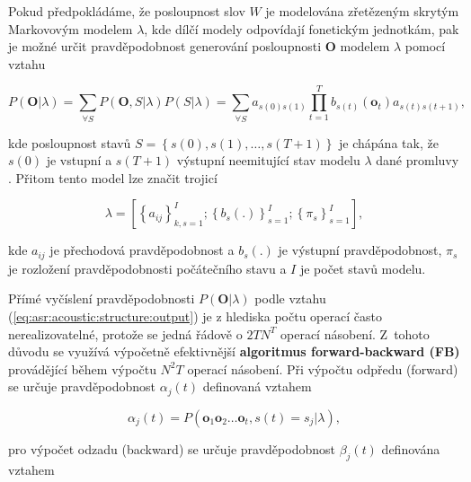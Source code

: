 Pokud předpokládáme, že posloupnost slov $W$ je modelována zřetězeným skrytým Markovovým modelem $\lambda$, kde dílčí modely odpovídají fonetickým jednotkám, pak je možné určit pravděpodobnost generování posloupnosti $\boldsymbol{O}$ modelem $\lambda$ pomocí vztahu

\begin{equation}
  P\left(\boldsymbol{O}|\lambda\right) = \sum_{\forall S} P\left(\boldsymbol{O}, S| \lambda\right)P\left(S|\lambda\right) = \sum_{\forall S} a_{s\left(0\right)s\left(1\right)} \prod_{t=1}^{T} b_{s\left(t\right)}\left(\boldsymbol{o}_t\right)a_{s\left(t\right)s\left(t+1\right)},
  \label{eq:asr:acoustic:structure:output}
\end{equation}

\noindent kde posloupnost stavů $S = \left\{s\left(0\right), s\left(1\right),\dots, s\left(T+1\right)\right\}$ je chápána tak, že $s\left(0\right)$ je vstupní a $s\left(T+1\right)$ výstupní neemitující stav modelu $\lambda$ dané promluvy \cite{Psutka2006}. Přitom tento model lze značit trojicí

\begin{equation}
  \lambda = \left[\left\{a_{ij}\right\}_{k,s=1}^{I}; \left\{b_s(.)\right\}_{s=1}^{I};\left\{\pi_{s}\right\}_{s=1}^{I}\right],
  \label{eq:asr:acoustic:structure:marking}
\end{equation}

\noindent kde $a_{ij}$ je přechodová pravděpodobnost a $b_s(.)$ je výstupní pravděpodobnost, $\pi_s$ je rozložení pravděpodobnosti počátečního stavu a $I$ je počet stavů modelu.

Přímé vyčíslení pravděpodobnosti $P\left(\boldsymbol{O}|\lambda\right)$ podle vztahu (\ref{eq:asr:acoustic:structure:output}) je z hlediska počtu operací často nerealizovatelné, protože se jedná řádově o $2TN^{T}$ operací násobení. Z~tohoto důvodu se využívá výpočetně efektivnější \textbf{algoritmus forward-backward (FB)} provádějící během výpočtu $N^{2}T$ operací násobení. Při výpočtu odpředu (forward) se určuje pravděpodobnost $\alpha_j\left(t\right)$ definovaná vztahem

\begin{equation}
  \alpha_{j}\left(t\right) = P\left(\boldsymbol{o}_1\boldsymbol{o}_2\dots \boldsymbol{o}_t, s\left(t\right)=s_j|\lambda\right),
  \label{eq:asr:acoustic:structure:forward}
\end{equation}

\noindent pro výpočet odzadu (backward) se určuje pravděpodobnost $\beta_j\left(t\right)$ definována vztahem


